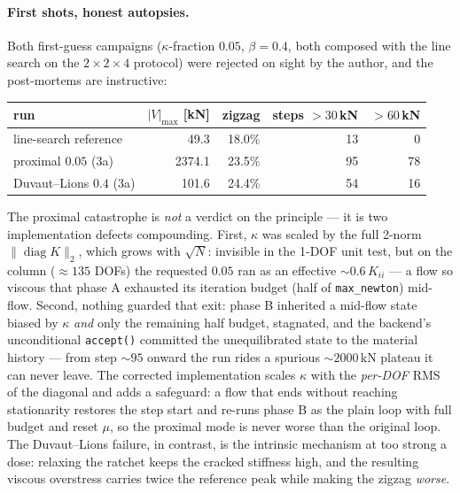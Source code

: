 \paragraph{First shots, honest autopsies.} Both first-guess campaigns
($\kappa$-fraction $0.05$, $\beta = 0.4$, both composed with the line
search on the $2{\times}2{\times}4$ protocol) were rejected on sight
by the author, and the post-mortems are instructive:

\begin{center}
\begin{tabular}{@{}lrrrr@{}}
\toprule
run & $|V|_{\max}$ [kN] & zigzag & steps $>30$\,kN & $>60$\,kN \\
\midrule
line-search reference    & 49.3   & 18.0\% & 13 & 0  \\
proximal $0.05$ (3a)     & 2374.1 & 23.5\% & 95 & 78 \\
Duvaut--Lions $0.4$ (3a) & 101.6  & 24.4\% & 54 & 16 \\
\bottomrule
\end{tabular}
\end{center}

The proximal catastrophe is \emph{not} a verdict on the principle ---
it is two implementation defects compounding. First, $\kappa$ was
scaled by the full 2-norm $\lVert\operatorname{diag}K\rVert_2$, which
grows with $\sqrt{N}$: invisible in the 1-DOF unit test, but on the
column ($\approx 135$ DOFs) the requested $0.05$ ran as an effective
$\sim 0.6\,K_{ii}$ --- a flow so viscous that phase A exhausted its
iteration budget (half of \texttt{max\_newton}) mid-flow. Second,
nothing guarded that exit: phase B inherited a mid-flow state biased
by $\kappa$ \emph{and} only the remaining half budget, stagnated, and
the backend's unconditional \texttt{accept()} committed the
unequilibrated state to the material history --- from step ${\sim}95$
onward the run rides a spurious $\sim 2000$\,kN plateau it can never
leave. The corrected implementation scales $\kappa$ with the
\emph{per-DOF} RMS of the diagonal and adds a safeguard: a flow that
ends without reaching stationarity restores the step start and re-runs
phase B as the plain loop with full budget and reset $\mu$, so the
proximal mode is never worse than the original loop. The
Duvaut--Lions failure, in contrast, is the intrinsic mechanism at too
strong a dose: relaxing the ratchet keeps the cracked stiffness high,
and the resulting viscous overstress carries twice the reference peak
while making the zigzag \emph{worse}.

